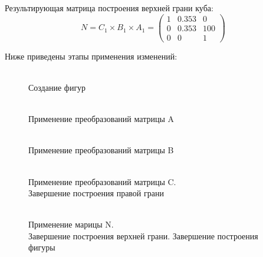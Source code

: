 Результирующая матрица построения верхней грани куба:
\begin{equation*}
    N = C_{1}\times B_{1}\times A_{1} =
    \begin{pmatrix}
        1& 0.353& 0\\
        0& 0.353& 100\\
        0&  0& 1
    \end{pmatrix}
\end{equation*}
\vspace{12pt}

\newpage
Ниже приведены этапы применения изменений:
\hspace{0pt}
\begin{figure}[H]
    \begin{minipage}[h]{0.25\linewidth}
        \\
        Создание фигур
    \end{minipage}
    \hfill
    \begin{minipage}[h]{0.25\linewidth}
        \\
        Применение преобразований матрицы A
    \end{minipage}
    \hfill
    \begin{minipage}[h]{0.25\linewidth}
        \\
        Применение преобразований матрицы B
    \end{minipage}
    \vfill
    \vspace{12pt}
    \begin{minipage}[h]{0.47\linewidth}
        \\
        Применение преобразований матрицы C.\\
        Завершение построения правой грани
    \end{minipage}
    \hfill
    \begin{minipage}[h]{0.47\linewidth}
        \\
        Применение марицы N.\\
        Завершение построения верхней грани. Завершение построения фигуры
    \end{minipage}

\end{figure}
